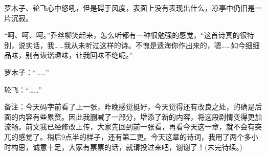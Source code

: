 \begin{this_body}
罗木子、轮飞心中怒吼，但是碍于风度，表面上没有表现出什么，凉亭中仍旧是一片沉寂。

“呵、呵、呵。”乔丝柳笑起来，怎么听都有一种很勉强的感觉，“这首诗真的很特别，说实话，我……我从未听过这样的诗。不愧是遗海你作出来的，嗯……如今细细品味，别有诙谐趣味，让我回味不绝呢。”

罗木子：“……”

轮飞：“……”

备注：今天码字前看了上一张，昨晚感觉挺好，今天觉得还有改良之处，的确是后面的内容有些累赘。因此我删减了一部分，增添了新的内容，将这段剧情变得更加流畅。前文我已经修改上传，大家先回到前一张看，再看今天这一章，就不会有突兀的感觉了。稍后9点半的样子，还有第二更。今天这章的诗词，我用了两个多小时构思，诚意十足，大家有票票的话，就请投过来吧，谢谢了！(未完待续。)

\end{this_body}

